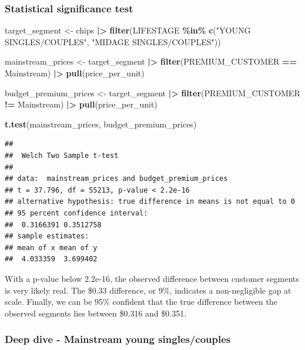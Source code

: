 \documentclass[
]{article}
\newenvironment{Shaded}{\begin{snugshade}}{\end{snugshade}}
\newcommand{\FunctionTok}[1]{\textcolor[rgb]{0.13,0.29,0.53}{\textbf{#1}}}
\newcommand{\NormalTok}[1]{#1}
\newcommand{\OtherTok}[1]{\textcolor[rgb]{0.56,0.35,0.01}{#1}}
\newcommand{\SpecialCharTok}[1]{\textcolor[rgb]{0.81,0.36,0.00}{\textbf{#1}}}
\newcommand{\StringTok}[1]{\textcolor[rgb]{0.31,0.60,0.02}{#1}}
\begin{document}
\subsubsection{Statistical significance
test}\label{statistical-significance-test}

\begin{Shaded}
\begin{Highlighting}[]
\NormalTok{target\_segment }\OtherTok{\textless{}{-}}\NormalTok{ chips }\SpecialCharTok{|\textgreater{}} 
  \FunctionTok{filter}\NormalTok{(LIFESTAGE }\SpecialCharTok{\%in\%} \FunctionTok{c}\NormalTok{(}\StringTok{"YOUNG SINGLES/COUPLES"}\NormalTok{, }\StringTok{"MIDAGE SINGLES/COUPLES"}\NormalTok{))}

\NormalTok{mainstream\_prices }\OtherTok{\textless{}{-}}\NormalTok{ target\_segment }\SpecialCharTok{|\textgreater{}} 
  \FunctionTok{filter}\NormalTok{(PREMIUM\_CUSTOMER }\SpecialCharTok{==} \StringTok{\textquotesingle{}Mainstream\textquotesingle{}}\NormalTok{) }\SpecialCharTok{|\textgreater{}} 
  \FunctionTok{pull}\NormalTok{(price\_per\_unit)}

\NormalTok{budget\_premium\_prices }\OtherTok{\textless{}{-}}\NormalTok{ target\_segment }\SpecialCharTok{|\textgreater{}} 
  \FunctionTok{filter}\NormalTok{(PREMIUM\_CUSTOMER }\SpecialCharTok{!=} \StringTok{\textquotesingle{}Mainstream\textquotesingle{}}\NormalTok{) }\SpecialCharTok{|\textgreater{}} 
  \FunctionTok{pull}\NormalTok{(price\_per\_unit)}

\FunctionTok{t.test}\NormalTok{(mainstream\_prices, budget\_premium\_prices)}
\end{Highlighting}
\end{Shaded}

\begin{verbatim}
## 
##  Welch Two Sample t-test
## 
## data:  mainstream_prices and budget_premium_prices
## t = 37.796, df = 55213, p-value < 2.2e-16
## alternative hypothesis: true difference in means is not equal to 0
## 95 percent confidence interval:
##  0.3166391 0.3512758
## sample estimates:
## mean of x mean of y 
##  4.033359  3.699402
\end{verbatim}

With a p-value below 2.2e-16, the observed difference between customer
segments is very likely real. The \$0.33 difference, or 9\%, indicates a
non-negligible gap at scale. Finally, we can be 95\% confident that the
true difference between the observed segments lies between \$0.316 and
\$0.351.

\subsubsection{Deep dive - Mainstream young
singles/couples}\label{deep-dive---mainstream-young-singlescouples}
\end{document}
